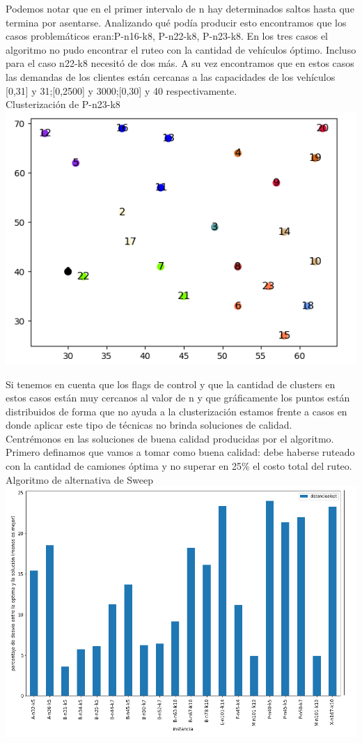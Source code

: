 \documentclass[11pt,a4paper]{article}
\begin{document}
\bigskip
Podemos notar que en el primer intervalo de n hay determinados saltos hasta que termina por asentarse. Analizando qué podía producir esto encontramos que los casos problemáticos eran:P-n16-k8, P-n22-k8, P-n23-k8. En los tres casos el algoritmo no pudo encontrar el ruteo con la cantidad de vehículos óptimo. Incluso para el caso n22-k8 necesitó de dos más. A su vez encontramos que en estos casos las demandas de los clientes están cercanas a las capacidades de los vehículos [0,31] y 31;[0,2500] y 3000;[0,30] y 40 respectivamente. 
\\
Clusterización de P-n23-k8
\center
\includegraphics[scale=.5]{graf/comparativa_casos_prob.png}

Si tenemos en cuenta que los flags de control y que la cantidad de clusters en estos casos están muy cercanos al valor de n y que gráficamente los puntos están distribuidos de forma que no ayuda a la clusterización estamos frente a casos en donde aplicar este tipo de técnicas no brinda soluciones de calidad.\\
Centrémonos en las soluciones de buena calidad producidas por el algoritmo. Primero definamos que vamos a tomar como buena calidad: debe haberse ruteado con la cantidad de camiones óptima y no superar en 25\% el costo total del ruteo.
\\ \bigskip 
Algoritmo de alternativa de Sweep
\includegraphics[scale=.6]{graf/comparativa_de_barra.png}
\end{document}
